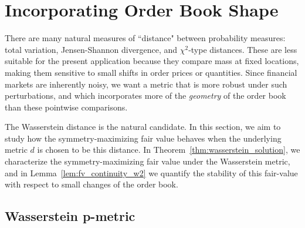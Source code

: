 \section{Incorporating Order Book Shape}
\label{sec:incorporating_order_book_shape}

There are many natural measures of ``distance" between probability measures: total
variation, Jensen-Shannon divergence, and $\chi^2$-type distances. These are less
suitable for the present application because they compare mass at fixed locations,
making them sensitive to small shifts in order prices or quantities. Since financial
markets are inherently noisy, we want a metric that is more robust under such perturbations,
and which incorporates more of the \textit{geometry} of the order book than these pointwise
comparisons.

The Wasserstein distance is the natural candidate. In this section, we aim to study
how the symmetry-maximizing fair value behaves when the underlying metric $d$ is chosen to be this distance.
In Theorem~\ref{thm:wasserstein_solution}, we characterize the symmetry-maximizing fair value under the Wasserstein metric,
and in Lemma~\ref{lem:fv_continuity_w2} we quantify the stability of this fair-value with respect to small changes
of the order book.


\subsection{Wasserstein p-metric}

